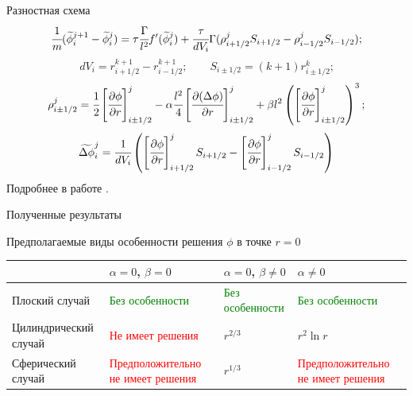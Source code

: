 \begin{frame}{Разностная схема}
$$\cfrac{1}{m} (\widetilde{\phi}_i^{j + 1} - \widetilde{\phi}_i^j) = \tau \cfrac{\Gamma}{l^2}
f'(\widetilde{\phi}_i^j) + \cfrac{\tau}{dV_i} \Gamma (\rho_{i + 1/2}^j S_{i + 1/2} -
\rho_{i - 1/2}^j S_{i - 1/2}) \text{;}$$
$$dV_i = r_{i + 1/2}^{k + 1} - r_{i - 1/2}^{k + 1}; \qquad
S_{i \pm 1/2} = (k + 1) r_{i \pm 1/2}^k \text{;}$$
$$\rho_{i \pm 1/2}^j = \cfrac{1}{2}
\left[ \cfrac{\partial \phi}{\partial r} \right]_{i \pm 1/2}^j -
\alpha \cfrac{l^2}{4} \left[ \cfrac{\partial (\Delta \phi)}{\partial r} \right]_{i \pm 1/2}^j +
\beta l^2 \left( \left[ \cfrac{\partial \phi}{\partial r} \right]_{i \pm 1/2}^j \right)^3
\text{;}$$
$$\widetilde{\Delta \phi}_i^j = \cfrac{1}{dV_i}
\left( \left[ \cfrac{\partial \phi}{\partial r} \right]_{i + 1/2}^j S_{i + 1/2} -
\left[ \cfrac{\partial \phi}{\partial r} \right]_{i - 1/2}^j S_{i - 1/2} \right)$$
Подробнее в работе \cite{ponomarev_finite_volumes}.
\end{frame}


\begin{frame}{Полученные результаты}
\vspace{-1cm}
\begin{center}
	Предполагаемые виды особенности решения $\phi$ в точке $r = 0$
\end{center}
\begin{tabular}{|m{3cm}||m{3.5cm}|m{3.5cm}|m{3.5cm}|}
	\hline
	\vspace*{2mm} \hfill \vspace*{2mm} &\centering $\alpha = 0$, $\beta = 0$ &
	\centering $\alpha = 0$, $\beta \neq 0$ & \centering \arraybackslash $\alpha \neq 0$ \\
	\hline
	\hline
	\vspace{2mm} Плоский \linebreak случай \vspace{2mm} &
	\textcolor{green}{Без особенности} & \textcolor{green}{Без особенности} & \textcolor{green}{Без особенности} \\
	\hline
	\vspace{2mm} Цилиндрический \linebreak случай \vspace{2mm} &
	\textcolor{red}{Не имеет решения} & $r^{2/3}$ & $r^2 \ln r$ \\
	\hline
	\vspace{2mm} Сферический \linebreak случай \vspace{2mm} &
	\textcolor{red}{Предположительно не имеет решения} & $r^{1/3}$ & \textcolor{red}{Предположительно не имеет решения} \\
	\hline
\end{tabular}
\end{frame}


